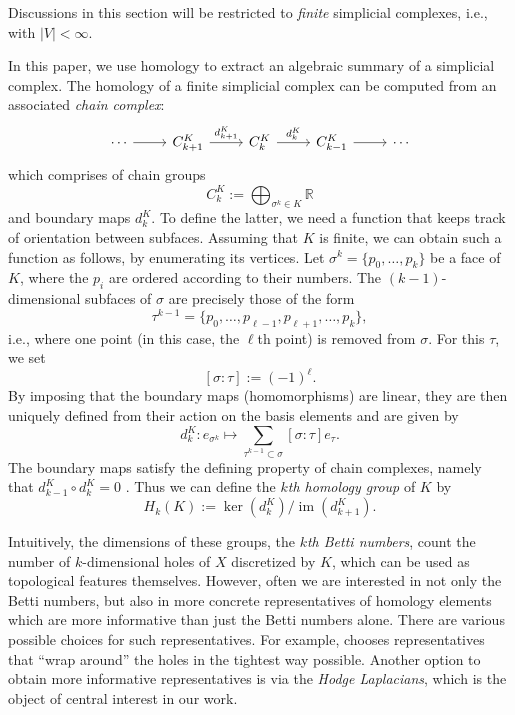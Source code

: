 \documentclass[11pt]{article}
\theoremstyle{definition}
\theoremstyle{remark}
\DeclareMathOperator{\im}{im}
\newcommand{\R}{\mathbb{R}}
\begin{document}
Discussions in this section will be restricted to \emph{finite} simplicial complexes, i.e., with $|V|< \infty$. 

In this paper, we use homology to extract an algebraic summary of a simplicial complex. The homology of a finite simplicial complex can be computed from an associated \emph{chain complex}:
\[
\begin{tikzcd}
\cdots \arrow[r] & C^{K}_{k+1}  \arrow[r, "d^{K}_{k+1}"] & C^{K}_{k} \arrow[r, "d^{K}_{k}"] & C^{K}_{k-1} \arrow[r] & \cdots
\end{tikzcd}
\]
which comprises of chain groups 
$$
C_k^K:=\bigoplus_{\sigma^k \in K} \R
$$ 
and boundary maps $d_k^K$. To define the latter, we need a function that keeps track of orientation between subfaces. Assuming that $K$ is finite, we can obtain such a function as follows, by enumerating its vertices. Let $\sigma^k=\{p_0,\dots,p_k\}$ be a face of $K$, where the $p_i$ are ordered according to their numbers. The $(k-1)$-dimensional subfaces of $\sigma$ are precisely those of the form 
    $$
    \tau^{k-1}=\{p_0,\dots,p_{\ell-1},p_{\ell+1},\dots,p_k\},
    $$
    i.e., where one point (in this case, the $\ell$th point) is removed from $\sigma$.
    For this $\tau$, we set 
    \begin{equation} \label{eq:sign}
    [\sigma:\tau]:=(-1)^\ell.
    \end{equation}
By imposing that the boundary maps (homomorphisms) are linear, they are then uniquely defined from their action on the basis elements and are given by 
$$
    d_k^K: e_{\sigma^k} \mapsto \sum_{\tau^{k-1}\subset \sigma} [\sigma:\tau] e_\tau.
$$
The boundary maps satisfy the defining property of chain complexes, namely that $d^K_{k-1} \circ d^K_k = 0$ \citep[Lemma 2.1]{hatcher}. Thus we can define the \emph{$k$th homology group} of $K$ by
\[
H_k(K) := \ker(d^K_k)/\im(d^K_{k+1}).
\]

Intuitively, the dimensions of these groups, the \emph{$k$th Betti numbers}, count the number of $k$-dimensional holes of $X$ discretized by $K$, which can be used as topological features themselves. However, often we are interested in not only the Betti numbers, but also in more concrete representatives of homology elements which are more informative than just the Betti numbers alone. There are various possible choices for such representatives. For example, \citet{tightestrep} chooses representatives that ``wrap around'' the holes in the tightest way possible. Another option to obtain more informative representatives is via the \emph{Hodge Laplacians}, which is the object of central interest in our work.
\end{document}
